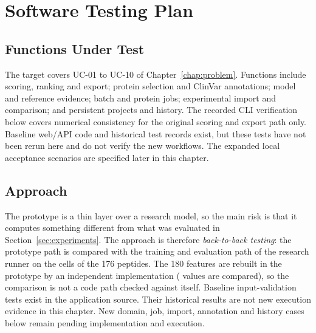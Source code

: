 
\section{Software Testing Plan}\label{sec:testplan}
\subsection{Functions Under Test}
The target covers UC-01 to UC-10 of Chapter~\ref{chap:problem}. Functions include scoring, ranking
and export; protein selection and ClinVar annotations; model and reference evidence; batch and
protein jobs; experimental import and comparison; and persistent projects and history. The recorded CLI verification below
covers numerical consistency for the original scoring and export path only. Baseline web/API code
and historical test records exist, but these tests have not been rerun here and do not verify the new
workflows. The expanded local acceptance scenarios are specified later in this chapter.
\subsection{Approach}
The prototype is a thin layer over a research model, so the main risk is that it computes something different from what was
evaluated in Section~\ref{sec:experiments}. The approach is therefore \emph{back-to-back testing}: the prototype path is compared with the
training and evaluation path of the research runner on the \nVerCells{} cells of the 176 peptides. The 180 features are rebuilt in the
prototype by an independent implementation (\nVerFeatures{} values are compared), so the comparison is not a code path checked against itself.
Baseline input-validation tests exist in the application source. Their historical results are not
new execution evidence in this chapter. New domain, job, import, annotation and history cases below
remain pending implementation and execution.
